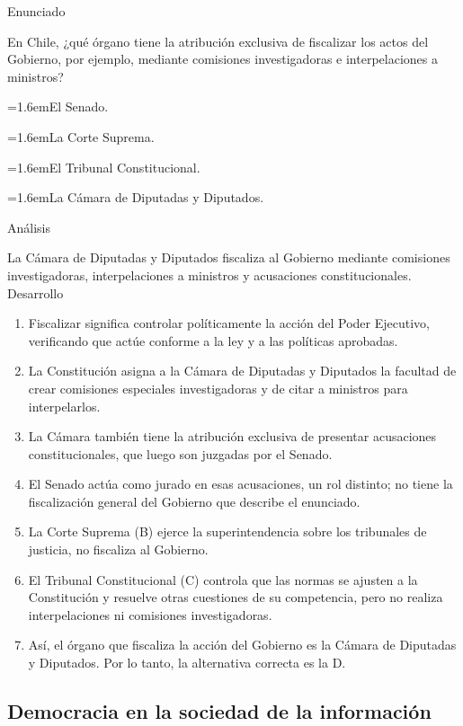 \documentclass[10pt,a4paper,twocolumn]{article}
\newcommand{\alternativa}[2]{\par\noindent\hangindent=1.6em\hangafter=1\makebox[1.6em][l]{\tecla{#1}}#2\par}
\newcommand{\clave}[1]{\par\smallskip{\sffamily\footnotesize\color{esmeralda} Clave \teclaok{#1}}\par}
\begin{document}
\begin{ejemplo}
{\sffamily\footnotesize\color{zinc500} Enunciado}\par
En Chile, ¿qué órgano tiene la atribución exclusiva de fiscalizar los actos del Gobierno, por ejemplo, mediante comisiones investigadoras e interpelaciones a ministros?
\alternativa{A}{El Senado.}
\alternativa{B}{La Corte Suprema.}
\alternativa{C}{El Tribunal Constitucional.}
\alternativa{D}{La Cámara de Diputadas y Diputados.}
\clave{D}
{\sffamily\footnotesize\color{zinc500} Análisis}\par La Cámara de Diputadas y Diputados fiscaliza al Gobierno mediante comisiones investigadoras, interpelaciones a ministros y acusaciones constitucionales.
{\sffamily\footnotesize\color{zinc500} Desarrollo}
\begin{enumerate}
  \item Fiscalizar significa controlar políticamente la acción del Poder Ejecutivo, verificando que actúe conforme a la ley y a las políticas aprobadas.
  \item La Constitución asigna a la Cámara de Diputadas y Diputados la facultad de crear comisiones especiales investigadoras y de citar a ministros para interpelarlos.
  \item La Cámara también tiene la atribución exclusiva de presentar acusaciones constitucionales, que luego son juzgadas por el Senado.
  \item El Senado actúa como jurado en esas acusaciones, un rol distinto; no tiene la fiscalización general del Gobierno que describe el enunciado.
  \item La Corte Suprema (B) ejerce la superintendencia sobre los tribunales de justicia, no fiscaliza al Gobierno.
  \item El Tribunal Constitucional (C) controla que las normas se ajusten a la Constitución y resuelve otras cuestiones de su competencia, pero no realiza interpelaciones ni comisiones investigadoras.
  \item Así, el órgano que fiscaliza la acción del Gobierno es la Cámara de Diputadas y Diputados. Por lo tanto, la alternativa correcta es la D.
\end{enumerate}
\end{ejemplo}

\subsection{Democracia en la sociedad de la información}
\end{document}
